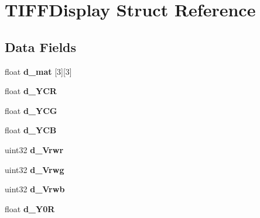 \hypertarget{struct_t_i_f_f_display}{}\section{T\+I\+F\+F\+Display Struct Reference}
\label{struct_t_i_f_f_display}
\subsection*{Data Fields}
\begin{DoxyCompactItemize}
\item 
\hypertarget{struct_t_i_f_f_display_abb041b5dd327e0c3f7767dc463a5b986}{}float {\bfseries d\+\_\+mat} \mbox{[}3\mbox{]}\mbox{[}3\mbox{]}\label{struct_t_i_f_f_display_abb041b5dd327e0c3f7767dc463a5b986}

\item 
\hypertarget{struct_t_i_f_f_display_af447b0b9def39ebbff67e0014a895697}{}float {\bfseries d\+\_\+\+Y\+C\+R}\label{struct_t_i_f_f_display_af447b0b9def39ebbff67e0014a895697}

\item 
\hypertarget{struct_t_i_f_f_display_a306abbbdc18b2c47b0b7d115d0b73875}{}float {\bfseries d\+\_\+\+Y\+C\+G}\label{struct_t_i_f_f_display_a306abbbdc18b2c47b0b7d115d0b73875}

\item 
\hypertarget{struct_t_i_f_f_display_abbacc01acc59400cc960d0433ed310ff}{}float {\bfseries d\+\_\+\+Y\+C\+B}\label{struct_t_i_f_f_display_abbacc01acc59400cc960d0433ed310ff}

\item 
\hypertarget{struct_t_i_f_f_display_a916091f2dd1f7499f4365935c9dd4b58}{}uint32 {\bfseries d\+\_\+\+Vrwr}\label{struct_t_i_f_f_display_a916091f2dd1f7499f4365935c9dd4b58}

\item 
\hypertarget{struct_t_i_f_f_display_a976d3a9e3fa8fb7dcf7a8052fce337d4}{}uint32 {\bfseries d\+\_\+\+Vrwg}\label{struct_t_i_f_f_display_a976d3a9e3fa8fb7dcf7a8052fce337d4}

\item 
\hypertarget{struct_t_i_f_f_display_a2cb3e2646b2320ee3ab188e109109095}{}uint32 {\bfseries d\+\_\+\+Vrwb}\label{struct_t_i_f_f_display_a2cb3e2646b2320ee3ab188e109109095}

\item 
\hypertarget{struct_t_i_f_f_display_abc511554646bf0c74b39960a0ee6a779}{}float {\bfseries d\+\_\+\+Y0\+R}\label{struct_t_i_f_f_display_abc511554646bf0c74b39960a0ee6a779}


\end{DoxyCompactItemize}
